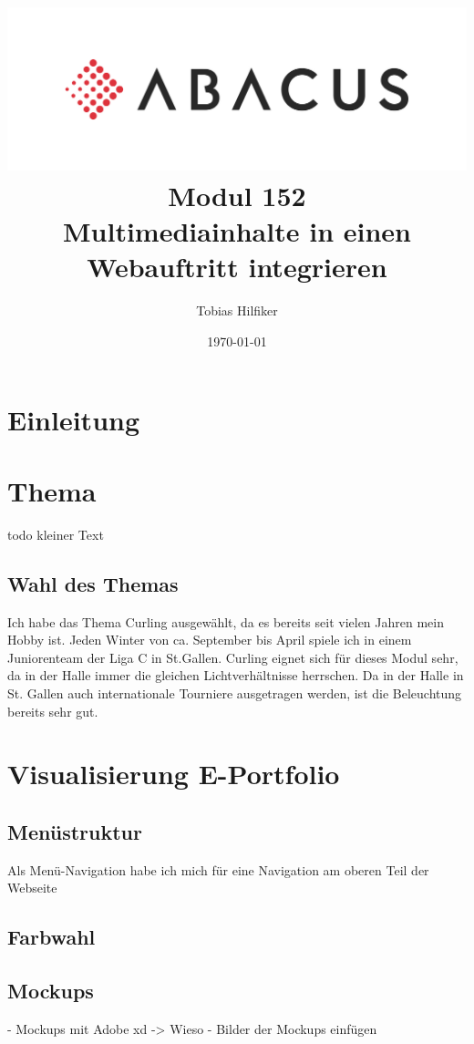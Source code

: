 \documentclass[11pt]{article}
\title{
    \includegraphics{media/frontpage.jpg}
    Modul 152 \\
    Multimediainhalte in einen Webauftritt integrieren}
\author{Tobias Hilfiker}
\date{\today}
\begin{document}
    \maketitle
    \pagebreak

    \tableofcontents
    \pagebreak

    \section{Einleitung}

    \section{Thema}

    todo kleiner Text

    \subsection{Wahl des Themas}

    Ich habe das Thema Curling ausgewählt, da es bereits seit vielen Jahren mein Hobby ist. Jeden Winter
    von ca. September bis April spiele ich in einem Juniorenteam der Liga C in St.Gallen. Curling eignet
    sich für dieses Modul sehr, da in der Halle immer die gleichen Lichtverhältnisse herrschen. Da in
    der Halle in St. Gallen auch internationale Tourniere ausgetragen werden, ist die Beleuchtung bereits
    sehr gut.

    \section{Visualisierung E-Portfolio}

    \subsection{Menüstruktur}
    Als Menü-Navigation habe ich mich für eine Navigation am oberen Teil der Webseite

    \subsection{Farbwahl}

    \subsection{Mockups}
    - Mockups mit Adobe xd -> Wieso
    - Bilder der Mockups einfügen
\end{document}
